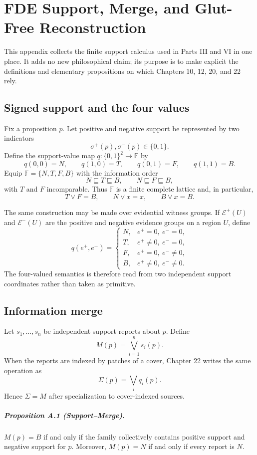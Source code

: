 \chapter{FDE Support, Merge, and Glut-Free Reconstruction}
\label{app:fde-support-merge}

This appendix collects the finite support calculus used in Parts III and VI in one place. It adds no new philosophical claim; its purpose is to make explicit the definitions and elementary propositions on which Chapters 10, 12, 20, and 22 rely.

\section*{Signed support and the four values}
Fix a proposition $p$. Let positive and negative support be represented by two indicators
\[
\sigma^+(p),\sigma^-(p)\in\{0,1\}.
\]
Define the support-value map $q:\{0,1\}^2\to\mathbb F$ by
\[
q(0,0)=N,\qquad q(1,0)=T,\qquad q(0,1)=F,\qquad q(1,1)=B.
\]
Equip $\mathbb F=\{N,T,F,B\}$ with the information order
\[
N\sqsubseteq T\sqsubseteq B,\qquad N\sqsubseteq F\sqsubseteq B,
\]
with $T$ and $F$ incomparable. Thus $\mathbb F$ is a finite complete lattice and, in particular,
\[
T\vee F=B,\qquad N\vee x=x,\qquad B\vee x=B.
\]

The same construction may be made over evidential witness groups. If $\mathcal E^+(U)$ and $\mathcal E^-(U)$ are the positive and negative evidence groups on a region $U$, define
\[
q(e^+,e^-)=
\begin{cases}
N,&e^+=0,\ e^-=0,\\
T,&e^+\neq0,\ e^-=0,\\
F,&e^+=0,\ e^-\neq0,\\
B,&e^+\neq0,\ e^-\neq0.
\end{cases}
\]
The four-valued semantics is therefore read from two independent support coordinates rather than taken as primitive.

\section*{Information merge}
Let $s_1,\ldots,s_n$ be independent support reports about $p$. Define
\[
M(p)=\bigvee_{i=1}^n s_i(p).
\]
When the reports are indexed by patches of a cover, Chapter 22 writes the same operation as
\[
\Sigma(p)=\bigvee_i q_i(p).
\]
Hence $\Sigma=M$ after specialization to cover-indexed sources.

\paragraph{Proposition A.1 (Support--Merge).}
$M(p)=B$ if and only if the family collectively contains positive support and negative support for $p$. Moreover, $M(p)=N$ if and only if every report is $N$.

